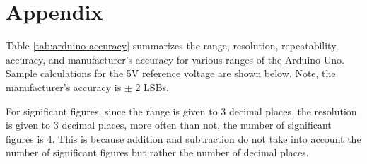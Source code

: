 \section{Appendix}
Table \ref{tab:arduino-accuracy} summarizes the range, resolution, repeatability, accuracy, and manufacturer's accuracy for various ranges of the 
Arduino Uno. Sample calculations for the 5V reference voltage are shown below. Note, the manufacturer's accuracy is $\pm$ 2 LSBs.


For significant figures, since the range is given to 3 decimal places, the resolution is given to 3 decimal places, more often
than not, the number of significant figures is 4. This is because addition and subtraction do not take into account the number of significant figures
but rather the number of decimal places.

